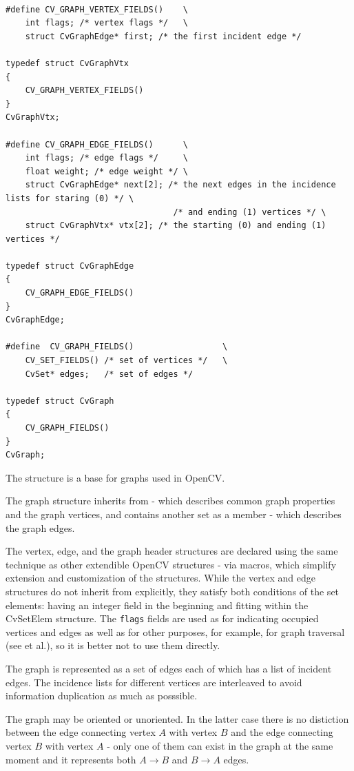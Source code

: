 \begin{lstlisting}

#define CV_GRAPH_VERTEX_FIELDS()    \
    int flags; /* vertex flags */   \
    struct CvGraphEdge* first; /* the first incident edge */

typedef struct CvGraphVtx
{
    CV_GRAPH_VERTEX_FIELDS()
}
CvGraphVtx;

#define CV_GRAPH_EDGE_FIELDS()      \
    int flags; /* edge flags */     \
    float weight; /* edge weight */ \
    struct CvGraphEdge* next[2]; /* the next edges in the incidence lists for staring (0) */ \
                                  /* and ending (1) vertices */ \
    struct CvGraphVtx* vtx[2]; /* the starting (0) and ending (1) vertices */

typedef struct CvGraphEdge
{
    CV_GRAPH_EDGE_FIELDS()
}
CvGraphEdge;

#define  CV_GRAPH_FIELDS()                  \
    CV_SET_FIELDS() /* set of vertices */   \
    CvSet* edges;   /* set of edges */

typedef struct CvGraph
{
    CV_GRAPH_FIELDS()
}
CvGraph;

\end{lstlisting}

The structure  is a base for graphs used in OpenCV.

The graph structure inherits from  - which describes common graph properties and the graph vertices, and contains another set as a member - which describes the graph edges.

The vertex, edge, and the graph header structures are declared using the
same technique as other extendible OpenCV structures - via macros, which
simplify extension and customization of the structures. While the vertex
and edge structures do not inherit from  explicitly, they
satisfy both conditions of the set elements: having an integer field in
the beginning and fitting within the CvSetElem structure. The \texttt{flags} fields are
used as for indicating occupied vertices and edges as well as for other
purposes, for example, for graph traversal (see \cross{CreateGraphScanner}
et al.), so it is better not to use them directly.

The graph is represented as a set of edges each of which has a list of
incident edges. The incidence lists for different vertices are interleaved
to avoid information duplication as much as posssible.

The graph may be oriented or unoriented. In the latter case there is no
distiction between the edge connecting vertex $A$ with vertex $B$ and the edge
connecting vertex $B$ with vertex $A$ - only one of them can exist in the
graph at the same moment and it represents both $A \rightarrow B$ and
$B \rightarrow A$ edges.

